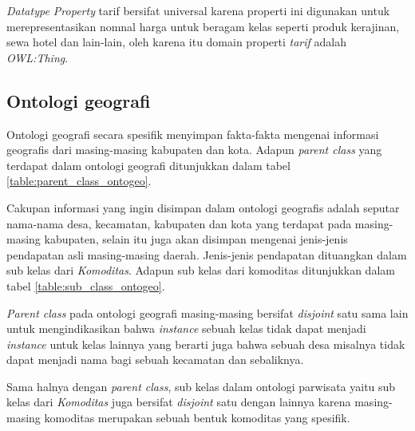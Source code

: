 \emph{Datatype Property} tarif bersifat universal karena properti ini digunakan untuk merepresentasikan nomnal harga untuk beragam kelas seperti produk kerajinan, sewa hotel dan lain-lain, oleh karena itu domain properti \emph{tarif} adalah \emph{OWL:Thing}.

\subsection{Ontologi geografi}
Ontologi geografi secara spesifik menyimpan fakta-fakta mengenai informasi geografis dari masing-masing kabupaten dan kota. Adapun \emph{parent class} yang terdapat dalam ontologi geografi ditunjukkan dalam tabel \ref{table:parent_class_ontogeo}.

Cakupan informasi yang ingin disimpan dalam ontologi geografis adalah seputar nama-nama desa, kecamatan, kabupaten dan kota yang terdapat pada masing-masing kabupaten, selain itu juga akan disimpan mengenai jenis-jenis pendapatan asli masing-masing daerah. Jenis-jenis pendapatan dituangkan dalam sub kelas dari \emph{Komoditas}. Adapun sub kelas dari komoditas ditunjukkan dalam tabel \ref{table:sub_class_ontogeo}.

\emph{Parent class} pada ontologi geografi masing-masing bersifat \emph{disjoint} satu sama lain untuk mengindikasikan bahwa \emph{instance} sebuah kelas tidak dapat menjadi \emph{instance} untuk kelas lainnya yang berarti juga bahwa sebuah desa misalnya tidak dapat menjadi nama bagi sebuah kecamatan dan sebaliknya.

Sama halnya dengan \emph{parent class}, sub kelas dalam ontologi parwisata yaitu sub kelas dari \emph{Komoditas} juga bersifat \emph{disjoint} satu dengan lainnya karena masing-masing komoditas merupakan sebuah bentuk komoditas yang spesifik.

